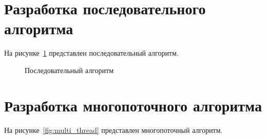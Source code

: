 \clearpage

\section{Разработка последовательного алгоритма}

На рисунке~\ref{fig:single_thread} представлен последовательный алгоритм.

\begin{figure}[h!]
	\caption{Последовательный алгоритм}
	\label{fig:single_thread}
\end{figure}

\clearpage

\section{Разработка многопоточного алгоритма}

На рисунке~\ref{fig:multi_thread} представлен многопоточный алгоритм.


